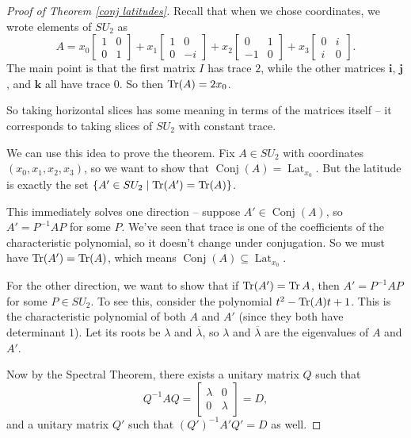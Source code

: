 \begin{proof}[Proof of Theorem \ref{conj latitudes}]
Recall that when we chose coordinates, we wrote elements of $SU_2$ as \[A = x_0\begin{bmatrix} 1 & 0 \\ 0 & 1 \end{bmatrix} + x_1\begin{bmatrix} 1 & 0 \\ 0 & -i \end{bmatrix} + x_2 \begin{bmatrix} 0 & 1 \\ -1 & 0 \end{bmatrix} + x_3\begin{bmatrix} 0 & i \\ i & 0 \end{bmatrix}.\] The main point is that the first matrix $I$ has trace $2$, while the other matrices $\mathbf{i}$, $\mathbf{j}$, and $\mathbf{k}$ all have trace $0$. So then $\operatorname{Tr}(A) = 2x_0$. 

So taking horizontal slices has some meaning in terms of the matrices itself -- it corresponds to taking slices of $SU_2$ with constant trace. 

We can use this idea to prove the theorem. Fix $A \in SU_2$ with coordinates $(x_0, x_1, x_2, x_3)$, so we want to show that $\operatorname{Conj}(A) = \operatorname{Lat}_{x_0}$. But the latitude is exactly the set $\{A' \in SU_2 \mid \operatorname{Tr}(A') = \operatorname{Tr}(A)\}$. 

This immediately solves one direction -- suppose $A' \in \operatorname{Conj}(A)$, so $A' = P^{-1}AP$ for some $P$. We've seen that trace is one of the coefficients of the characteristic polynomial, so it doesn't change under conjugation. So we must have $\operatorname{Tr}(A') = \operatorname{Tr}(A)$, which means $\operatorname{Conj}(A) \subseteq \operatorname{Lat}_{x_0}$. 

For the other direction, we want to show that if $\operatorname{Tr}(A') = \operatorname{Tr}{A}$, then $A' = P^{-1}AP$ for some $P \in SU_2$. To see this, consider the polynomial $t^2 - \operatorname{Tr}(A) t + 1$. This is the characteristic polynomial of both $A$ and $A'$ (since they both have determinant $1$). Let its roots be $\lambda$ and $\overline{\lambda}$, so $\lambda$ and $\overline{\lambda}$ are the eigenvalues of $A$ and $A'$. 

Now by the Spectral Theorem, there exists a unitary matrix $Q$ such that \[Q^{-1}AQ = \begin{bmatrix} \lambda & 0 \\ 0 & \lambda \end{bmatrix} = D,\] and a unitary matrix $Q'$ such that $(Q')^{-1}A'Q' = D$ as well. 


\end{proof}
